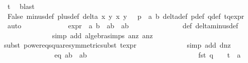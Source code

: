 \begin{isabellebody}
\ t{}\ \isamarkupfalse%
\ blast\isanewline
\ \ \ \ \ \ \ \ \ \ \ \ \ \isamarkupfalse%
\ False\ {\isasymdelta}{\isacharunderscore}minus{\isacharunderscore}def\ {\isasymdelta}{\isacharunderscore}plus{\isacharunderscore}def\ {\isacartoucheopen}delta{\isacharprime}\ x{}\ y{}\ x{}\ y{}\ {\isacharequal}\ {}{\isacartoucheclose}\ {\isacartoucheopen}p\ {\isacharequal}\ {\isacharparenleft}a{}{\isacharcomma}\ b{}{\isacharparenright}{\isacartoucheclose}\ delta{\isacharprime}{\isacharunderscore}def\ p{\isacharunderscore}def\ q{\isacharunderscore}def\ tq{\isacharunderscore}expr\ \isamarkupfalse%
\ auto\isanewline
\ \ \ \ \ \ \ \ \ \ \ \isamarkupfalse%
\ {\isasymdelta}{\isacharprime}{\isacharunderscore}expr{\isacharcolon}\ {\isachardoublequoteopen}{\isasymdelta}{\isacharprime}\ a{}\ b{}\ {\isacharequal}\ a{}{\isacharasterisk}b{}\ {\isacharminus}\ a{}{\isacharasterisk}b{}{\isachardoublequoteclose}\isanewline
\ \ \ \ \ \ \ \ \ \ \ \ \ \isamarkupfalse%
\ {\isasymdelta}{\isacharprime}{\isacharunderscore}def\ delta{\isacharunderscore}minus{\isacharunderscore}def\ \isanewline
\ \ \ \ \ \ \ \ \ \ \ \ \ \isamarkupfalse%
{\isacharparenleft}simp\ add{\isacharcolon}\ algebra{\isacharunderscore}simps\ a{}{\isacharunderscore}nz\ a{}{\isacharunderscore}nz{\isacharparenright}\isanewline
\ \ \ \ \ \ \ \ \ \ \ \ \ \isamarkupfalse%
{\isacharparenleft}subst\ power{}{\isacharunderscore}eq{\isacharunderscore}square{\isacharbrackleft}symmetric{\isacharbrackright}{\isacharcomma}subst\ t{\isacharunderscore}expr{\isacharparenleft}{}{\isacharparenright}{\isacharparenright}\isanewline
\ \ \ \ \ \ \ \ \ \ \ \ \ \isamarkupfalse%
{\isacharparenleft}simp\ add{\isacharcolon}\ d{\isacharunderscore}nz{\isacharparenright}\isanewline
\ \ \ \ \ \ \ \ \ \ \ \isamarkupfalse%
\ \isamarkupfalse%
\ eq{}{\isacharprime}{\isacharcolon}\ {\isachardoublequoteopen}a{}{\isacharasterisk}b{}\ {\isacharminus}\ a{}{\isacharasterisk}b{}\ {\isacharequal}\ {}{\isachardoublequoteclose}\ \isanewline
\ \ \ \ \ \ \ \ \ \ \ \isamarkupfalse%
\ {\isacharminus}\isanewline
\ \ \ \ \ \ \ \ \ \ \ \ \ \isamarkupfalse%
\ {\isachardoublequoteopen}{\isacharparenleft}fst\ q{\isacharparenright}\ {\isacharequal}\ {\isacharparenleft}{}\ {\isacharslash}\ {\isacharparenleft}t\ {\isacharasterisk}\ a{}{\isacharparenright}{\isacharparenright}{\isachardoublequoteclose}\ \isanewline

\end{isabellebody}

